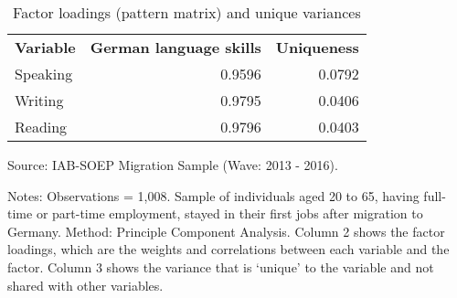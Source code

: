 \documentclass[12pt,a4paper]{article}
\begin{document}
\begin{table}[htbp]
  \centering
  \caption{Factor loadings (pattern matrix) and unique variances}
\begin{center}
    \begin{tabular}{lrr}
    \toprule
    \multicolumn{1}{c}{\textbf{Variable}} & \multicolumn{1}{c}{\textbf{German language skills}} & \multicolumn{1}{c}{\textbf{Uniqueness}} \\
    Speaking & 0.9596 & 0.0792 \\
    Writing & 0.9795 & 0.0406 \\
    Reading & 0.9796 & 0.0403 \\
    \bottomrule
    \end{tabular}%
\end{center}
\begin{tablenotes}
      \small
      \item Source: IAB-SOEP Migration Sample (Wave: 2013 - 2016).
      \item Notes: Observations = 1,008. Sample of individuals aged 20 to 65, having full-time or part-time employment, stayed in their first jobs after migration to Germany.  Method: Principle Component Analysis. Column 2 shows the factor loadings, which are the weights and correlations between each variable and the factor. Column 3 shows  the variance that is ‘unique’ to the variable and not shared with other variables.
    \end{tablenotes}
\end{table}%
\end{document}
